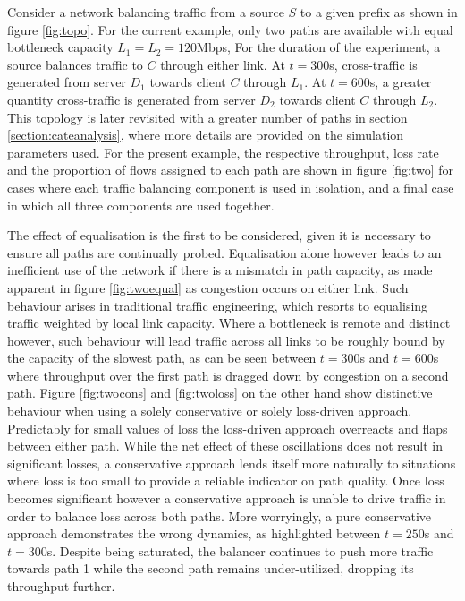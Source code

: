 Consider a network balancing traffic from a source $S$ to a given prefix as shown in figure \ref{fig:topo}.
For the current example, only two paths are available with equal bottleneck capacity $L_1=L_2=120$Mbps,
For the duration of the experiment, a source balances traffic to $C$ through either link.
At $t=300$s, cross-traffic is generated from server $D_1$ towards client $C$ through $L_1$.
At $t=600$s, a greater quantity cross-traffic is generated from server $D_2$ towards client $C$ through $L_2$.
This topology is later revisited with a greater number of paths in section \ref{section:cateanalysis}, where more details are provided on the simulation parameters used.
For the present example, the respective throughput, loss rate and the proportion of flows assigned to each path are shown in figure \ref{fig:two} for cases where each traffic balancing component is used in isolation, and a final case in which all three components are used together.

The effect of equalisation is the first to be considered, given it is necessary to ensure all paths are continually probed. 
Equalisation alone however leads to an inefficient use of the network if there is a mismatch in path capacity, as made apparent in figure \ref{fig:twoequal} as congestion occurs on either link. 
Such behaviour arises in traditional traffic engineering, which resorts to equalising traffic weighted by local link capacity.  
Where a bottleneck is remote and distinct however, such behaviour will lead traffic across all links to be roughly bound by the capacity of the slowest path, as can be seen between $t=300$s and $t=600$s where throughput over the first path is dragged down by congestion on a second path.  
Figure \ref{fig:twocons} and \ref{fig:twoloss} on the other hand show distinctive behaviour when using a solely conservative or solely loss-driven approach. 
Predictably for small values of loss the loss-driven approach overreacts and flaps between either path. 
While the net effect of these oscillations does not result in significant losses, a conservative approach lends itself more naturally to situations where loss is too small to provide a reliable indicator on path quality. 
Once loss becomes significant however a conservative approach is unable to drive traffic in order to balance loss across both paths. 
More worryingly, a pure conservative approach demonstrates the wrong dynamics, as highlighted between $t=250$s and $t=300$s. 
Despite being saturated, the balancer continues to push more traffic towards path 1 while the second path remains under-utilized, dropping its throughput further.

